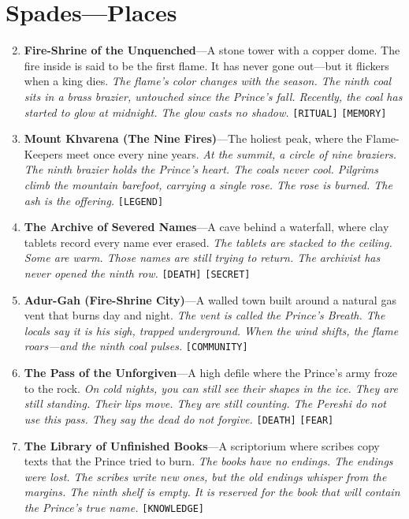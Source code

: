\section*{Spades---Places}
\label{sec:pereshi-places}
\begin{enumerate}
\setcounter{enumi}{1}
\item \textbf{Fire-Shrine of the Unquenched}---A stone tower with a copper dome. The fire inside is said to be the first flame. It has never gone out---but it flickers when a king dies.
  \hfill \textit{The flame's color changes with the season. The ninth coal sits in a brass brazier, untouched since the Prince's fall. Recently, the coal has started to glow at midnight. The glow casts no shadow.} \texttt{[RITUAL]} \texttt{[MEMORY]}
\item \textbf{Mount Khvarena (The Nine Fires)}---The holiest peak, where the Flame-Keepers meet once every nine years.
  \hfill \textit{At the summit, a circle of nine braziers. The ninth brazier holds the Prince's heart. The coals never cool. Pilgrims climb the mountain barefoot, carrying a single rose. The rose is burned. The ash is the offering.} \texttt{[LEGEND]}
\item \textbf{The Archive of Severed Names}---A cave behind a waterfall, where clay tablets record every name ever erased.
  \hfill \textit{The tablets are stacked to the ceiling. Some are warm. Those names are still trying to return. The archivist has never opened the ninth row.} \texttt{[DEATH]} \texttt{[SECRET]}
\item \textbf{Adur-Gah (Fire-Shrine City)}---A walled town built around a natural gas vent that burns day and night.
  \hfill \textit{The vent is called the Prince's Breath. The locals say it is his sigh, trapped underground. When the wind shifts, the flame roars---and the ninth coal pulses.} \texttt{[COMMUNITY]}
\item \textbf{The Pass of the Unforgiven}---A high defile where the Prince's army froze to the rock.
  \hfill \textit{On cold nights, you can still see their shapes in the ice. They are still standing. Their lips move. They are still counting. The Pereshi do not use this pass. They say the dead do not forgive.} \texttt{[DEATH]} \texttt{[FEAR]}
\item \textbf{The Library of Unfinished Books}---A scriptorium where scribes copy texts that the Prince tried to burn.
  \hfill \textit{The books have no endings. The endings were lost. The scribes write new ones, but the old endings whisper from the margins. The ninth shelf is empty. It is reserved for the book that will contain the Prince's true name.} \texttt{[KNOWLEDGE]}

\end{enumerate}
